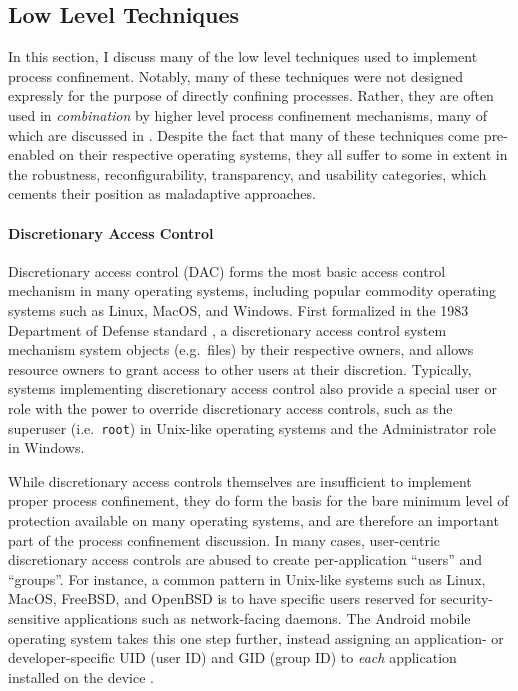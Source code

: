 \documentclass[dvipsnames, 12pt]{article}
\begin{document}
\subsection{Low Level Techniques}

In this section, I discuss many of the low level techniques used to implement
process confinement. Notably, many of these techniques were not designed
expressly for the purpose of directly confining processes. Rather, they are
often used in \textit{combination} by higher level process confinement
mechanisms, many of which are discussed in . Despite the
fact that many of these techniques come pre-enabled on their respective operating
systems, they all suffer to some in extent in the robustness, reconfigurability,
transparency, and usability categories, which cements their position as
maladaptive approaches.

\paragraph*{Discretionary Access Control}
Discretionary access control (DAC) forms the most basic access control mechanism
in many operating systems, including popular commodity operating systems such as
Linux, MacOS, and Windows.  First formalized in the 1983 Department of Defense
standard \cite{orange_book}, a discretionary access control system mechanism
system objects (e.g.~files) by their respective owners, and allows resource
owners to grant access to other users at their discretion.  Typically, systems
implementing discretionary access control also provide a special user or role
with the power to override discretionary access controls, such as the superuser
(i.e.~\texttt{root}) in Unix-like operating systems and the Administrator role
in Windows.

While discretionary access controls themselves are insufficient to implement
proper process confinement, they do form the basis for the bare minimum level of
protection available on many operating systems, and are therefore an important
part of the process confinement discussion. In many cases, user-centric
discretionary access controls are abused to create per-application
\enquote{users} and \enquote{groups}. For instance, a common pattern in
Unix-like systems such as Linux, MacOS, FreeBSD, and OpenBSD is to have specific
users reserved for security-sensitive applications such as network-facing
daemons. The Android mobile operating system takes this one step further,
instead assigning an application- or developer-specific UID (user ID) and GID
(group ID) to \textit{each} application installed on the device
\cite{android_security}.
\end{document}
